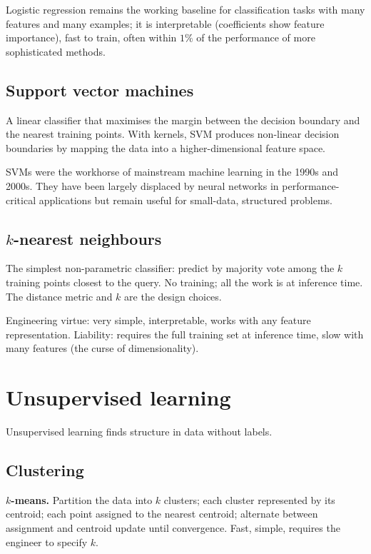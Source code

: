 Logistic regression remains the working baseline for classification tasks with many features and many examples; it is interpretable (coefficients show feature importance), fast to train, often within $1\%$ of the performance of more sophisticated methods.

\subsection{Support vector machines}

A linear classifier that maximises the margin between the decision boundary and the nearest training points. With kernels, SVM produces non-linear decision boundaries by mapping the data into a higher-dimensional feature space.

SVMs were the workhorse of mainstream machine learning in the 1990s and 2000s. They have been largely displaced by neural networks in performance-critical applications but remain useful for small-data, structured problems.

\subsection{$k$-nearest neighbours}

The simplest non-parametric classifier: predict by majority vote among the $k$ training points closest to the query. No training; all the work is at inference time. The distance metric and $k$ are the design choices.

Engineering virtue: very simple, interpretable, works with any feature representation. Liability: requires the full training set at inference time, slow with many features (the curse of dimensionality).

\section{Unsupervised learning}

Unsupervised learning finds structure in data without labels.

\subsection{Clustering}

\textbf{$k$-means.} Partition the data into $k$ clusters; each cluster represented by its centroid; each point assigned to the nearest centroid; alternate between assignment and centroid update until convergence. Fast, simple, requires the engineer to specify $k$.

